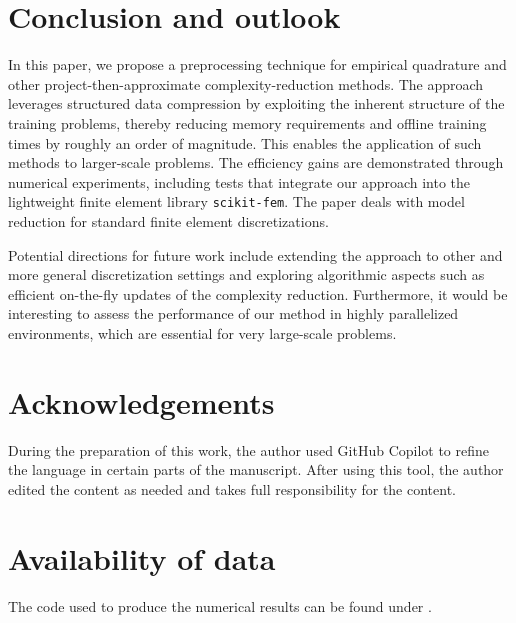 \documentclass[onefignum,onetabnum]{siamart251104}
\newcommand{\acro}[1]{{\texttt{#1}}}  %
\newcommand{\blsRevB}[1]{{{#1}}} %
\begin{document}



\section*{Conclusion and outlook}
In this paper, we propose a preprocessing technique for empirical quadrature and other project-then-approximate complexity-reduction methods. The approach leverages structured data compression by exploiting the inherent structure of the training problems, thereby reducing memory requirements and offline training times by roughly an order of magnitude. This enables the application of such methods to larger-scale problems. The efficiency gains are demonstrated through numerical experiments, including tests that integrate our approach into the lightweight finite element library \acro{scikit-fem}. The paper deals with model reduction for standard finite element discretizations.

Potential directions for future work include extending the approach to other and more general discretization settings and exploring algorithmic aspects such as efficient on-the-fly updates of the complexity reduction. Furthermore, it would be interesting to assess the performance of our method in highly parallelized environments, which are essential for very large-scale problems.



\section*{Acknowledgements}
During the preparation of this work, the author used GitHub Copilot to refine the language in certain parts of the manuscript. After using this tool, the author edited the content as needed and takes full responsibility for the content.

\section*{Availability of data}
\blsRevB{The code used to produce the numerical results can be found under \cite{zenodo:comRedBilCode2026}.}





\end{document}
